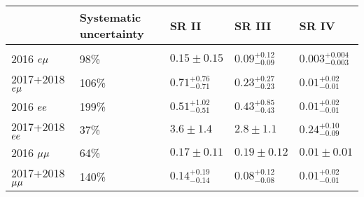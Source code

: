 \begin{table}
\renewcommand{\arraystretch}{1.3}
\noindent \centering{}
\label{500umto10cm_estimates}
\begin{tabular}{lllll}
\hline
  & Systematic uncertainty & SR II & SR III & SR IV\\
  \hline\\[-2.4ex]
2016 $e{\mu}$       & 98\%  & $0.15\pm0.15$           & $0.09^{+0.12}_{-0.09}$ & $0.003^{+0.004}_{-0.003}$\\[0.5ex]
2017+2018 $e{\mu}$  & 106\% & $0.71^{+0.76}_{-0.71}$  & $0.23^{+0.27}_{-0.23}$ & $0.01^{+0.02}_{-0.01}$\\[0.5ex]
2016 $ee$        & 199\% & $0.51^{+1.02}_{-0.51}$  & $0.43^{+0.85}_{-0.43}$ & $0.01^{+0.02}_{-0.01}$\\[0.5ex]
2017+2018 $ee$   & 37\%  & $3.6\pm1.4$             & $2.8\pm1.1$            & $0.24^{+0.10}_{-0.09}$\\[0.5ex]
2016 ${\mu}{\mu}$      & 64\%  & $0.17\pm0.11$           & $0.19\pm0.12$          & $0.01\pm0.01$\\[0.5ex]
2017+2018 ${\mu}{\mu}$ & 140\% & $0.14^{+0.19}_{-0.14}$  & $0.08^{+0.12}_{-0.08}$ & $0.01^{+0.02}_{-0.01}$\\[0.5ex]
\hline
\end{tabular}
\end{table}